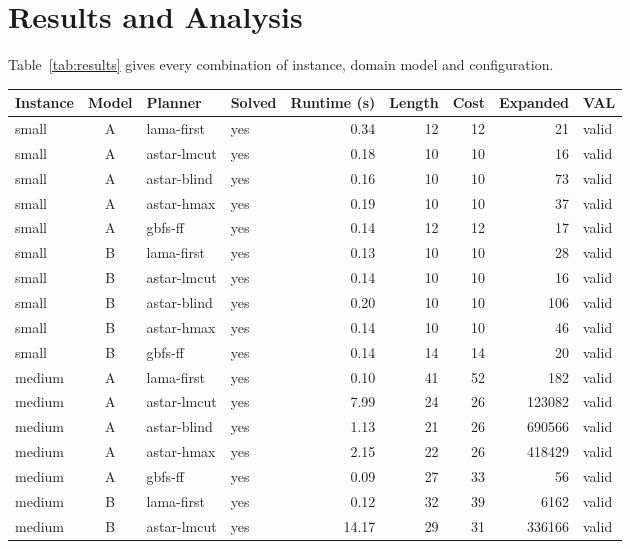 \documentclass[11pt,a4paper]{article}
\begin{document}
\section{Results and Analysis}
\label{sec:results}

Table~\ref{tab:results} gives every combination of instance, domain model and
configuration.

\begin{table}[p]
  \centering\footnotesize
  \begin{tabular}{@{}l c l l r r r r l@{}}
    \toprule
    Instance & Model & Planner & Solved & Runtime (s) & Length & Cost & Expanded & VAL \\
    \midrule
    small & A & lama-first & yes & 0.34 & 12 & 12 & 21 & valid \\
    small & A & astar-lmcut & yes & 0.18 & 10 & 10 & 16 & valid \\
    small & A & astar-blind & yes & 0.16 & 10 & 10 & 73 & valid \\
    small & A & astar-hmax & yes & 0.19 & 10 & 10 & 37 & valid \\
    small & A & gbfs-ff & yes & 0.14 & 12 & 12 & 17 & valid \\
    small & B & lama-first & yes & 0.13 & 10 & 10 & 28 & valid \\
    small & B & astar-lmcut & yes & 0.14 & 10 & 10 & 16 & valid \\
    small & B & astar-blind & yes & 0.20 & 10 & 10 & 106 & valid \\
    small & B & astar-hmax & yes & 0.14 & 10 & 10 & 46 & valid \\
    small & B & gbfs-ff & yes & 0.14 & 14 & 14 & 20 & valid \\
    \midrule
    medium & A & lama-first & yes & 0.10 & 41 & 52 & 182 & valid \\
    medium & A & astar-lmcut & yes & 7.99 & 24 & 26 & 123082 & valid \\
    medium & A & astar-blind & yes & 1.13 & 21 & 26 & 690566 & valid \\
    medium & A & astar-hmax & yes & 2.15 & 22 & 26 & 418429 & valid \\
    medium & A & gbfs-ff & yes & 0.09 & 27 & 33 & 56 & valid \\
    medium & B & lama-first & yes & 0.12 & 32 & 39 & 6162 & valid \\
    medium & B & astar-lmcut & yes & 14.17 & 29 & 31 & 336166 & valid \\

\end{tabular}
\end{table}
\end{document}
